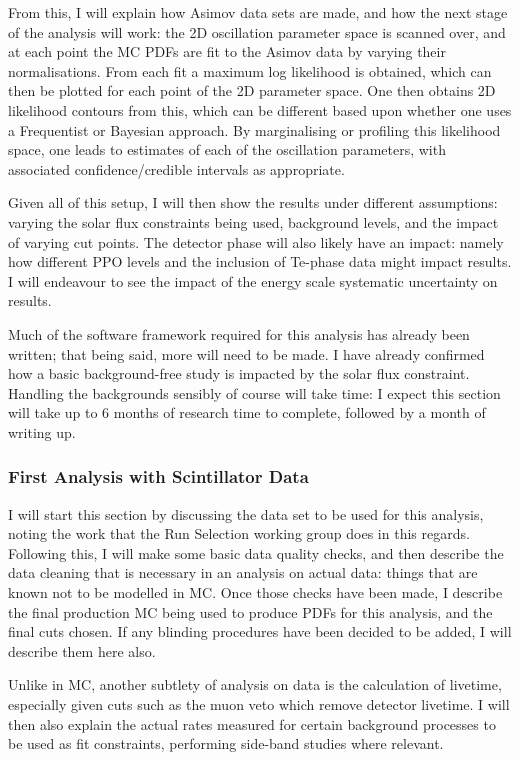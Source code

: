 From this, I will explain how Asimov data sets are made, and how the next stage of the analysis will work: the 2D oscillation parameter space is scanned over, and at each point the MC PDFs are fit to the Asimov data by varying their normalisations. From each fit a maximum log likelihood is obtained, which can then be plotted for each point of the 2D parameter space. One then obtains 2D likelihood contours from this, which can be different based upon whether one uses a Frequentist or Bayesian approach. By marginalising or profiling this likelihood space, one leads to estimates of each of the oscillation parameters, with associated confidence/credible intervals as appropriate.

Given all of this setup, I will then show the results under different assumptions: varying the solar flux constraints being used, background levels, and the impact of varying cut points. The detector phase will also likely have an impact: namely how different PPO levels and the inclusion of Te-phase data might impact results. I will endeavour to see the impact of the energy scale systematic uncertainty on results.

Much of the software framework required for this analysis has already been written; that being said, more will need to be made. I have already confirmed how a basic background-free study is impacted by the solar flux constraint. Handling the backgrounds sensibly of course will take time: I expect this section will take up to 6 months of research time to complete, followed by a month of writing up.

\subsubsection{First Analysis with Scintillator Data}
I will start this section by discussing the data set to be used for this analysis, noting the work that the Run Selection working group does in this regards. Following this, I will make some basic data quality checks, and then describe the data cleaning that is necessary in an analysis on actual data: things that are known not to be modelled in MC. Once those checks have been made, I describe the final production MC being used to produce PDFs for this analysis, and the final cuts chosen. If any blinding procedures have been decided to be added, I will describe them here also.

Unlike in MC, another subtlety of analysis on data is the calculation of livetime, especially given cuts such as the muon veto which remove detector livetime. I will then also explain the actual rates measured for certain background processes to be used as fit constraints, performing side-band studies where relevant.

